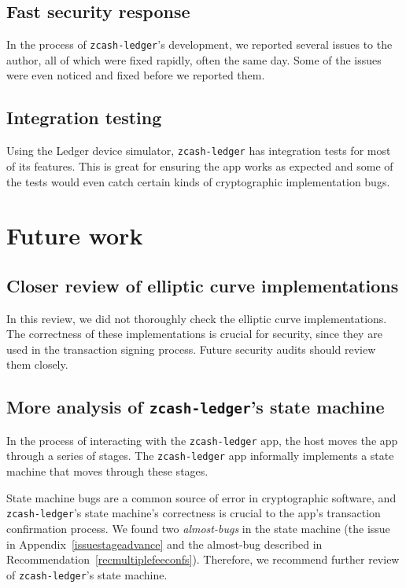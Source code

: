 \documentclass[10pt,titlepage]{article}
\begin{document}
\subsection{Fast security response}

In the process of \texttt{zcash-ledger}'s development, we reported several
issues to the author, all of which were fixed rapidly, often the same day. Some
of the issues were even noticed and fixed before we reported them.

\subsection{Integration testing}

Using the Ledger device simulator, \texttt{zcash-ledger} has integration tests
for most of its features. This is great for ensuring the app works as expected
and some of the tests would even catch certain kinds of cryptographic
implementation bugs.

\section{Future work} \label{secfuturework}

\subsection{Closer review of elliptic curve implementations} \label{sececcreview}

In this review, we did not thoroughly check the elliptic curve implementations.
The correctness of these implementations is crucial for security, since they are
used in the transaction signing process. Future security audits should review
them closely.

\subsection{More analysis of \texttt{zcash-ledger}'s state machine}

In the process of interacting with the \texttt{zcash-ledger} app, the host moves
the app through a series of stages. The \texttt{zcash-ledger} app informally
implements a state machine that moves through these stages.

State machine bugs are a common source of error in cryptographic software, and
\texttt{zcash-ledger}'s state machine's correctness is crucial to the app's
transaction confirmation process. We found two \emph{almost-bugs} in the state
machine (the issue in Appendix~\ref{issuestageadvance} and the almost-bug
described in Recommendation~\ref{recmultiplefeeconfs}). Therefore, we recommend
further review of \texttt{zcash-ledger}'s state machine.
\end{document}
